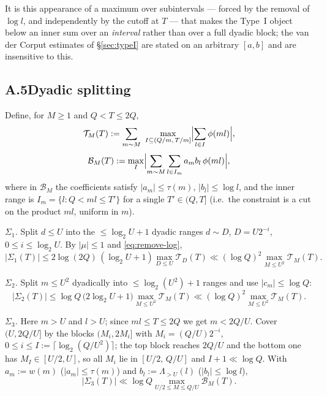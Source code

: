 \documentclass[11pt]{article}
\theoremstyle{definition}
\theoremstyle{plain}
\begin{document}
It is this appearance of a maximum over subintervals --- forced by the
removal of $\log l$, and independently by the cutoff at $T$ --- that
makes the Type~I object below an inner sum over an \emph{interval} rather
than over a full dyadic block; the van der Corput estimates of
\S\ref{sec:typeI} are stated on an arbitrary $[a,b]$ and are insensitive
to this.

\subsection*{A.5\quad Dyadic splitting}

Define, for $M\ge1$ and $Q<T\le 2Q$,
\[
\mathcal T_{M}(T):=\sum_{m\sim M}\ \max_{I\subseteq(Q/m,\,T/m]}
\Bigl|\sum_{l\in I}\phi(ml)\Bigr| ,
\]
\[
\mathcal B_{M}(T):=\max_{I}\Bigl|\sum_{m\sim M}\sum_{l\in I_{m}}
a_{m}b_{l}\,\phi(ml)\Bigr| ,
\]
where in $\mathcal B_{M}$ the coefficients satisfy $|a_{m}|\le\tau(m)$,
$|b_{l}|\le\log l$, and the inner range is $I_{m}=\{l: Q<ml\le T'\}$ for
a single $T'\in(Q,T]$ (i.e.\ the constraint is a cut on the product
$ml$, uniform in $m$).

\emph{$\Sigma_{1}$.}  Split $d\le U$ into the $\le\log_{2}U+1$ dyadic
ranges $d\sim D$, $D=U2^{-i}$, $0\le i\le\log_{2}U$.  By $|\mu|\le1$ and
\eqref{eq:remove-log},
\begin{equation}\label{eq:S1bd}
|\Sigma_{1}(T)|\le2\log(2Q)\,(\log_{2}U+1)\max_{D\le U}\mathcal T_{D}(T)
\ll(\log Q)^{2}\max_{M\le U^{2}}\mathcal T_{M}(T).
\end{equation}

\emph{$\Sigma_{2}$.}  Split $m\le U^{2}$ dyadically into
$\le\log_{2}(U^{2})+1$ ranges and use $|c_{m}|\le\log Q$:
\begin{equation}\label{eq:S2bd}
|\Sigma_{2}(T)|\le\log Q\,\bigl(2\log_{2}U+1\bigr)
\max_{M\le U^{2}}\mathcal T_{M}(T)
\ll(\log Q)^{2}\max_{M\le U^{2}}\mathcal T_{M}(T).
\end{equation}

\emph{$\Sigma_{3}$.}  Here $m>U$ and $l>U$; since $ml\le T\le 2Q$ we get
$m<2Q/U$.  Cover $(U,2Q/U]$ by the blocks $(M_{i},2M_{i}]$ with
$M_{i}=(Q/U)2^{-i}$, $0\le i\le I:=\lceil\log_{2}(Q/U^{2})\rceil$; the
top block reaches $2Q/U$ and the bottom one has
$M_{I}\in[U/2,U]$, so all $M_{i}$ lie in $[U/2,\,Q/U]$ and
$I+1\ll\log Q$.  With $a_{m}:=w(m)$ ($|a_{m}|\le\tau(m)$) and
$b_{l}:=\Lambda_{>U}(l)$ ($|b_{l}|\le\log l$),
\begin{equation}\label{eq:S3bd}
|\Sigma_{3}(T)|\ll\log Q\max_{U/2\le M\le Q/U}\mathcal B_{M}(T).
\end{equation}
\end{document}
